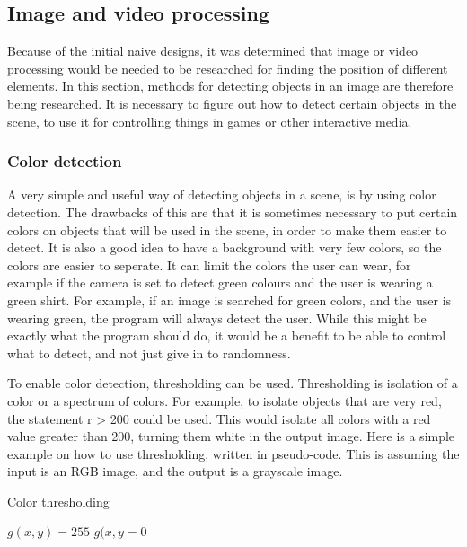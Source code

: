 \subsection{Image and video processing}
Because of the initial naive designs, it was determined that image or video processing would be needed to be researched for finding the position of different elements. In this section, methods for detecting objects in an image are therefore being researched. It is necessary to figure out how to detect certain objects in the scene, to use it for controlling things in games or other interactive media.

\subsubsection{Color detection}
A very simple and useful way of detecting objects in a scene, is by using color detection. The drawbacks of this are that it is sometimes necessary to put certain colors on objects that will be used in the scene, in order to make them easier to detect. It is also a good idea to have a background with very few colors, so the colors are easier to seperate. It can limit the colors the user can wear, for example if the camera is set to detect green colours and the user is wearing a green shirt. For example, if an image is searched for green colors, and the user is wearing green, the program will always detect the user. While this might be exactly what the program should do, it would be a benefit to be able to control what to detect, and not just give in to randomness.

To enable color detection, thresholding can be used. Thresholding is isolation of a color or a spectrum of colors. For example, to isolate objects that are very red, the statement r > 200 could be used. This would isolate all colors with a red value greater than 200, turning them white in the output image. Here is a simple example on how to use thresholding, written in pseudo-code. This is assuming the input is an RGB image, and the output is a grayscale image.

\begin{algorithm}[H]
\caption{Color thresholding}
\label{code:threshold}
\begin{algorithmic}
\STATE $g(x,y)=255$
\ELSE
\STATE $g(x,y = 0$
\ENDIF
\end{algorithmic}
\end{algorithm}

